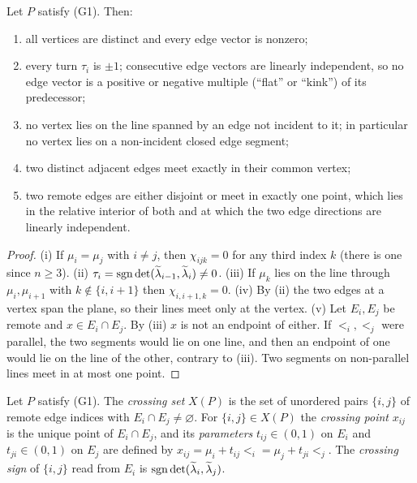 \begin{lemma}\label{lem:g1}
Let $P$ satisfy (G1). Then:
\begin{enumerate}
\item[(i)] all vertices are distinct and every edge vector is nonzero;
\item[(ii)] every turn $\tau_i$ is $\pm1$; consecutive edge vectors are
linearly independent, so no edge vector is a positive or negative multiple
(``flat'' or ``kink'') of its predecessor;
\item[(iii)] no vertex lies on the line spanned by an edge not incident to it;
in particular no vertex lies on a non-incident closed edge segment;
\item[(iv)] two distinct adjacent edges meet exactly in their common vertex;
\item[(v)] two remote edges are either disjoint or meet in exactly one point,
which lies in the relative interior of both and at which the two edge
directions are linearly independent.
\end{enumerate}
\end{lemma}
\begin{proof}
(i) If $\mu_i=\mu_j$ with $i\neq j$, then $\chi_{ijk}=0$ for any third index
$k$ (there is one since $n\geq3$). (ii) $\tau_i=\operatorname{sgn}\det(\widetilde\lambda_{i-1},\widetilde\lambda_i)\neq0$.
(iii) If $\mu_k$ lies on the line through $\mu_i,\mu_{i+1}$ with
$k\notin\{i,i+1\}$ then $\chi_{i,i+1,k}=0$. (iv) By (ii) the two edges at a
vertex span the plane, so their lines meet only at the vertex. (v) Let
$E_i,E_j$ be remote and $x\in E_i\cap E_j$. By (iii) $x$ is not an endpoint
of either. If $\lt_i,\lt_j$ were parallel, the two segments would lie on one
line, and then an endpoint of one would lie on the line of the other, contrary
to (iii). Two segments on non-parallel lines meet in at most one point.
\end{proof}

\begin{definition}[crossings]\label{def:crossings}
Let $P$ satisfy (G1). The \emph{crossing set} $X(P)$ is the set of unordered
pairs $\{i,j\}$ of remote edge indices with $E_i\cap E_j\neq\varnothing$. For
$\{i,j\}\in X(P)$ the \emph{crossing point} $x_{ij}$ is the unique point of
$E_i\cap E_j$, and its \emph{parameters} $t_{ij}\in(0,1)$ on $E_i$ and
$t_{ji}\in(0,1)$ on $E_j$ are defined by $x_{ij}=\mu_i+t_{ij}\lt_i
=\mu_j+t_{ji}\lt_j$. The \emph{crossing sign} of $\{i,j\}$ read from $E_i$ is
$\operatorname{sgn}\det(\widetilde\lambda_i,\widetilde\lambda_j)$.
\end{definition}

